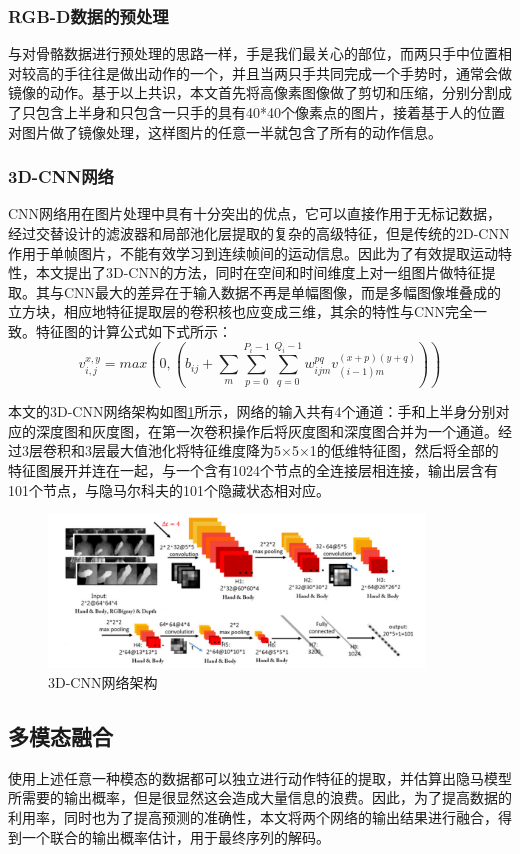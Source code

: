 \documentclass[a4paper, 12pt]{article}
\begin{document}
\subsubsection{RGB-D数据的预处理}
与对骨骼数据进行预处理的思路一样，手是我们最关心的部位，而两只手中位置相对较高的手往往是做出动作的一个，并且当两只手共同完成一个手势时，通常会做镜像的动作。基于以上共识，本文首先将高像素图像做了剪切和压缩，分别分割成了只包含上半身和只包含一只手的具有40*40个像素点的图片，接着基于人的位置对图片做了镜像处理，这样图片的任意一半就包含了所有的动作信息。

\subsubsection{3D-CNN网络}
CNN网络用在图片处理中具有十分突出的优点，它可以直接作用于无标记数据，经过交替设计的滤波器和局部池化层提取的复杂的高级特征，但是传统的2D-CNN作用于单帧图片，不能有效学习到连续帧间的运动信息\cite{p7}。因此为了有效提取运动特性，本文提出了3D-CNN的方法，同时在空间和时间维度上对一组图片做特征提取。其与CNN最大的差异在于输入数据不再是单幅图像，而是多幅图像堆叠成的立方块，相应地特征提取层的卷积核也应变成三维，其余的特性与CNN完全一致。特征图的计算公式如下式所示：
\begin{equation}
  v_{i,j}^{x,y} = max(0, (b_{ij} + \sum_m \sum_{p=0}^{P_i-1} \sum_{q=0}^{Q_i-1} w_{ijm}^{pq}v_{(i-1)m}^{(x+p)(y+q)}))
\end{equation}

本文的3D-CNN网络架构如图\ref{fig:3}所示，网络的输入共有4个通道：手和上半身分别对应的深度图和灰度图，在第一次卷积操作后将灰度图和深度图合并为一个通道。经过3层卷积和3层最大值池化将特征维度降为5×5×1的低维特征图，然后将全部的特征图展开并连在一起，与一个含有1024个节点的全连接层相连接，输出层含有101个节点，与隐马尔科夫的101个隐藏状态相对应。
\begin{figure}[ht]
  \centering
  \includegraphics[width=10cm]{cnnArchitecture.png}
  \caption{\label{fig:3}3D-CNN网络架构}
\end{figure}

\subsection{多模态融合}
使用上述任意一种模态的数据都可以独立进行动作特征的提取，并估算出隐马模型所需要的输出概率，但是很显然这会造成大量信息的浪费。因此，为了提高数据的利用率，同时也为了提高预测的准确性，本文将两个网络的输出结果进行融合，得到一个联合的输出概率估计，用于最终序列的解码。
\end{document}
